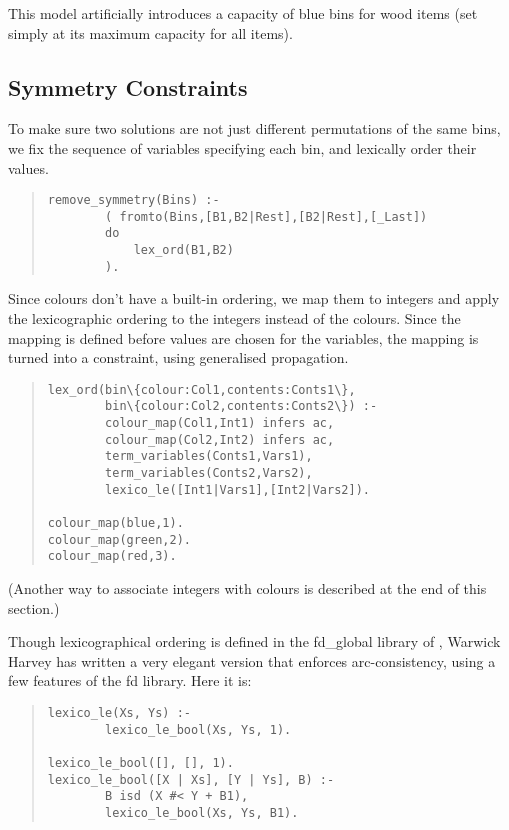 This model artificially introduces a capacity of blue bins for
wood items (set simply at its maximum capacity for all items).


\subsection{Symmetry Constraints}
To make sure two solutions are not just different permutations of the
same bins, we fix the sequence of variables specifying each bin, and
lexically order their values.

\begin{quote}
\begin{verbatim}
remove_symmetry(Bins) :-
        ( fromto(Bins,[B1,B2|Rest],[B2|Rest],[_Last])
        do
            lex_ord(B1,B2)
        ).
\end{verbatim}
\end{quote}

Since colours don't have a built-in ordering, we map them to integers
and apply the lexicographic ordering to the integers instead of the
colours.  Since the mapping is defined before values are chosen for the
variables, the mapping is turned into a constraint, using generalised
propagation.  
\begin{quote}
\begin{verbatim}
lex_ord(bin\{colour:Col1,contents:Conts1\},
        bin\{colour:Col2,contents:Conts2\}) :-
        colour_map(Col1,Int1) infers ac,
        colour_map(Col2,Int2) infers ac,
        term_variables(Conts1,Vars1),
        term_variables(Conts2,Vars2),
        lexico_le([Int1|Vars1],[Int2|Vars2]).

colour_map(blue,1).
colour_map(green,2).
colour_map(red,3).
\end{verbatim}
\end{quote}
(Another way to associate integers with colours is
described at the end of this section.)

Though lexicographical ordering is defined in the fd\_global library of
{ \eclipse }, Warwick
Harvey has written a very elegant version that enforces arc-consistency,
using a few features of the fd library.  Here it is:

\begin{quote}
\begin{verbatim}
lexico_le(Xs, Ys) :-
        lexico_le_bool(Xs, Ys, 1).

lexico_le_bool([], [], 1).
lexico_le_bool([X | Xs], [Y | Ys], B) :- 
        B isd (X #< Y + B1),
        lexico_le_bool(Xs, Ys, B1).
\end{verbatim}
\end{quote}

